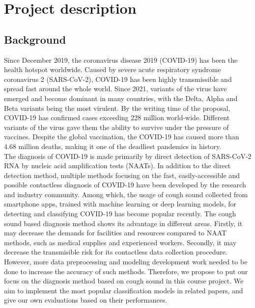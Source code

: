 \documentclass[11pt]{article}
\begin{document}
\section{Project description} %
\subsection{Background}
Since December 2019, the coronavirus disease 2019 (COVID-19) has been the health hotspot 
worldwide. Caused by severe acute respiratory syndrome coronavirus 2 (SARS-CoV-2), COVID-19
 has been highly transmissible and spread fast around the whole world. Since 2021, variants 
 of the virus have emerged and become dominant in many countries, with the Delta, Alpha and 
 Beta variants being the most virulent. By the writing time of the proposal, COVID-19 has
  confirmed cases exceeding 228 million world-wide\cite{enwiki:1044966507}. Different variants of the virus gave 
  them the ability to survive under the pressure of vaccines. Despite the global vaccination,
   the COVID-19 has caused more than  4.68 million deaths, making it one of the deadliest 
   pandemics in history.\\

\noindent
The diagnosis of COVID-19 is made primarily by direct detection of SARS-CoV-2 RNA by nucleic 
acid amplification tests (NAATs). In addition to the direct detection method, multiple methods 
focusing on the fast, easily-accessible and possible contactless diagnosis of COVID-19 have 
been developed by the research and industry community. Among which, the usage of cough sound 
collected from smartphone apps, trained with machine learning or deep learning models, for 
detecting and classifying COVID-19 has become popular recently\cite{PPR:PPR343330}. The cough sound based 
diagnosis method shows its advantage in different areas. Firstly, it may decrease the 
demands for facilities and resources compared to NAAT methods, such as medical supplies 
and experienced workers. Secondly, it may decrease the transmisible risk for its contactless 
data collection procedure. \\

\noindent
However, more data preprocessing and modeling development work needed to be done to increase 
the accuracy of such methods. Therefore, we propose to put our focus on the diagnosis method 
based on cough sound in this course project. We aim to implement the most popular classification 
models in related papers, and give our own evaluations based on their performances. 
\end{document}
